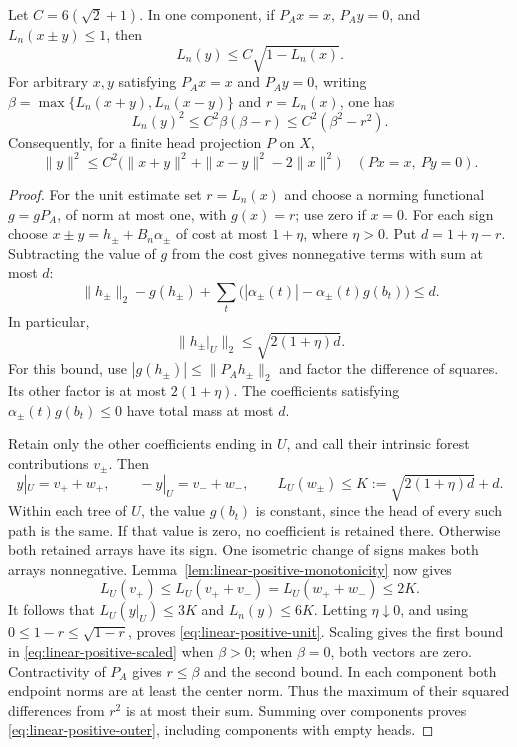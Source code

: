 \begin{theorem}
\label{thm:linear-positive-tail}
Let \(C=6(\sqrt2+1)\). In one component, if
\(P_Ax=x\), \(P_Ay=0\), and \(L_n(x\pm y)\le1\), then
\begin{equation}\label{eq:linear-positive-unit}
 L_n(y)\le C\sqrt{1-L_n(x)}.
\end{equation}
For arbitrary \(x,y\) satisfying \(P_Ax=x\) and \(P_Ay=0\), writing
\(\beta=\max\{L_n(x+y),L_n(x-y)\}\) and \(r=L_n(x)\), one has
\begin{equation}\label{eq:linear-positive-scaled}
 L_n(y)^2\le C^2\beta(\beta-r)\le C^2(\beta^2-r^2).
\end{equation}
Consequently, for a finite head projection \(P\) on \(X\),
\begin{equation}\label{eq:linear-positive-outer}
 \|y\|^2\le C^2\bigl(\|x+y\|^2+\|x-y\|^2-2\|x\|^2\bigr)
 \quad(Px=x,\ Py=0).
\end{equation}
\end{theorem}
\begin{proof}
For the unit estimate set \(r=L_n(x)\) and choose a norming functional
\(g=gP_A\), of norm at most one, with \(g(x)=r\); use zero if \(x=0\).
For each sign choose
\(x\pm y=h_\pm+B_n\alpha_\pm\) of cost at most \(1+\eta\), where
\(\eta>0\). Put \(d=1+\eta-r\). Subtracting the value of \(g\) from
the cost gives nonnegative terms with sum at most \(d\):
\[
 \|h_\pm\|_2-g(h_\pm)
 +\sum_t\bigl(|\alpha_\pm(t)|-\alpha_\pm(t)g(b_t)\bigr)\le d.
\]
In particular,
\[
 \|h_\pm|_U\|_2\le\sqrt{2(1+\eta)d}.
\]
For this bound, use \(|g(h_\pm)|\le\|P_Ah_\pm\|_2\) and factor
the difference of squares.  Its other factor is at most \(2(1+\eta)\).
The coefficients satisfying \(\alpha_\pm(t)g(b_t)\le0\) have total
mass at most \(d\).

Retain only the other coefficients ending in \(U\), and call their
intrinsic forest contributions \(v_\pm\). Then
\[
 y|_U=v_++w_+,\qquad -y|_U=v_-+w_-,\qquad
 L_U(w_\pm)\le K:=\sqrt{2(1+\eta)d}+d.
\]
Within each tree of \(U\), the value \(g(b_t)\) is constant, since
the head of every such path is the same. If that value is zero, no
coefficient is retained there. Otherwise both retained arrays have its
sign. One isometric change of signs makes both
arrays nonnegative. Lemma~\ref{lem:linear-positive-monotonicity} now gives
\[
 L_U(v_+)\le L_U(v_++v_-)
 =L_U(w_++w_-)\le2K.
\]
It follows that \(L_U(y|_U)\le3K\) and \(L_n(y)\le6K\).
Letting \(\eta\downarrow0\), and using
\(0\le1-r\le\sqrt{1-r}\), proves
\eqref{eq:linear-positive-unit}. Scaling gives the first bound in
\eqref{eq:linear-positive-scaled} when \(\beta>0\); when \(\beta=0\),
both vectors are zero. Contractivity of \(P_A\) gives \(r\le\beta\)
and the second bound. In each component both endpoint norms are at
least the center norm. Thus the maximum of their squared differences
from \(r^2\) is at most their sum. Summing over components proves
\eqref{eq:linear-positive-outer}, including components with empty heads.
\end{proof}


